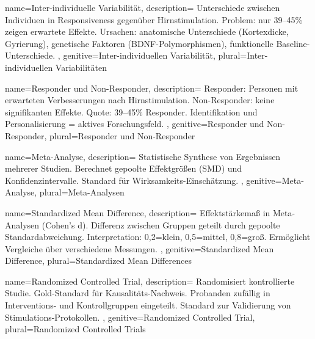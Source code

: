 	{
		name=Inter-individuelle Variabilität,
		description={
				Unterschiede zwischen Individuen in Responsiveness gegenüber Hirnstimulation. Problem: nur 39--45\% zeigen erwartete Effekte. Ursachen: anatomische Unterschiede (Kortexdicke, Gyrierung), genetische Faktoren (\gls{BDNF}-Polymorphismen), funktionelle Baseline-Unterschiede. \cite{vergallito_inter-individual_2022, chew_inter-_2015}
			},
		genitive=Inter-individuellen Variabilität,
		plural=Inter-individuellen Variabilitäten
	}

	{
		name=Responder und Non-Responder,
		description={
				Responder: Personen mit erwarteten Verbesserungen nach Hirnstimulation. Non-Responder: keine signifikanten Effekte. Quote: 39--45\% Responder. Identifikation und Personalisierung = aktives Forschungsfeld. \cite{vergallito_inter-individual_2022}
			},
		genitive=Responder und Non-Responder,
		plural=Responder und Non-Responder
	}

	{
		name=Meta-Analyse,
		description={
				Statistische Synthese von Ergebnissen mehrerer Studien. Berechnet gepoolte Effektgrößen (\gls{SMD}) und Konfidenzintervalle. Standard für Wirksamkeits-Einschätzung. \cite{senkowski_boosting_2022, simonsmeier_electrical_2018}
			},
		genitive=Meta-Analyse,
		plural=Meta-Analysen
	}

	{
		name=Standardized Mean Difference,
		description={
				Effektstärkemaß in Meta-Analysen (Cohen's d). Differenz zwischen Gruppen geteilt durch gepoolte Standardabweichung. Interpretation: 0,2=klein, 0,5=mittel, 0,8=groß. Ermöglicht Vergleiche über verschiedene Messungen. \cite{senkowski_boosting_2022}
			},
		genitive=Standardized Mean Difference,
		plural=Standardized Mean Differences
	}


	{
		name=Randomized Controlled Trial,
		description={
				Randomisiert kontrollierte Studie. Gold-Standard für Kausalitäts-Nachweis. Probanden zufällig in Interventions- und Kontrollgruppen eingeteilt. Standard zur Validierung von Stimulations-Protokollen.
			},
		genitive=Randomized Controlled Trial,
		plural=Randomized Controlled Trials
	}

\fi
